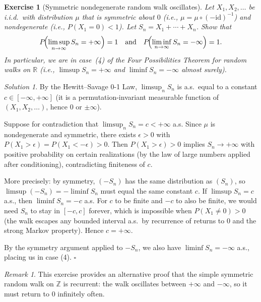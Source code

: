 \documentclass[12pt]{article}
\newtheorem{exercise}{Exercise}
\theoremstyle{remark}
\newtheorem*{solution}{Solution}
\newtheorem*{remark}{Remark}
\begin{document}
\begin{exercise}[Symmetric nondegenerate random walk oscillates]
\label{ex:oscillate}
Let $X_1, X_2, \ldots$ be i.i.d.\ with distribution $\mu$ that is symmetric about $0$
(i.e., $\mu = \mu \circ (-\mathrm{id})^{-1}$) and nondegenerate (i.e., $P(X_1 = 0) < 1$).
Let $S_n = X_1 + \cdots + X_n$.  Show that
\[
  P\!\Bigl(\limsup_{n\to\infty} S_n = +\infty\Bigr) = 1
  \quad\text{and}\quad
  P\!\Bigl(\liminf_{n\to\infty} S_n = -\infty\Bigr) = 1.
\]
In particular, we are in case~(4) of the Four Possibilities Theorem for random walks on
$\mathbb{R}$ (i.e., $\limsup S_n = +\infty$ and $\liminf S_n = -\infty$ almost surely).
\end{exercise}

\begin{solution}
By the Hewitt--Savage 0-1 Law, $\limsup_n S_n$ is a.s.\ equal to a constant
$c \in [-\infty, +\infty]$ (it is a permutation-invariant measurable function of
$(X_1, X_2, \ldots)$, hence $0$ or $\pm\infty$).

Suppose for contradiction that $\limsup_n S_n = c < +\infty$ a.s. Since $\mu$ is
nondegenerate and symmetric, there exists $\epsilon > 0$ with $P(X_1 > \epsilon) = P(X_1 < -\epsilon) > 0$.
Then $P(X_1 > \epsilon) > 0$ implies $S_n \to +\infty$ with positive probability on certain
realizations (by the law of large numbers applied after conditioning), contradicting
finiteness of $c$.

More precisely: by symmetry, $(-S_n)$ has the same distribution as $(S_n)$, so
$\limsup(-S_n) = -\liminf S_n$ must equal the same constant $c$.
If $\limsup S_n = c$ a.s., then $\liminf S_n = -c$ a.s. For $c$ to be finite and
$-c$ to also be finite, we would need $S_n$ to stay in $[-c, c]$ forever, which is
impossible when $P(X_1 \ne 0) > 0$ (the walk escapes any bounded interval a.s.\ by
recurrence of returns to $0$ and the strong Markov property).  Hence $c = +\infty$.

By the symmetry argument applied to $-S_n$, we also have $\liminf S_n = -\infty$
a.s., placing us in case (4). \hfill$\square$
\end{solution}

\begin{remark}
This exercise provides an alternative proof that the simple symmetric random walk on
$\mathbb{Z}$ is recurrent: the walk oscillates between $+\infty$ and $-\infty$, so it
must return to $0$ infinitely often.
\end{remark}
\end{document}

